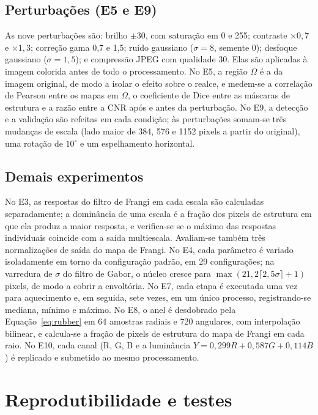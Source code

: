 \documentclass[12pt, oneside, a4paper, chapter=TITLE, section=TITLE,
               english, brazil]{abntex2}
\newcommand{\secao}[1]{\section[\texorpdfstring{\protect\MakeTextUppercase{#1}}{#1}]{#1}}
\begin{document}
\subsection{Perturbações (E5 e E9)}

As nove perturbações são: brilho $\pm 30$, com saturação em 0 e 255;
contraste $\times 0{,}7$ e $\times 1{,}3$; correção gama 0,7 e 1,5; ruído
gaussiano ($\sigma = 8$, semente 0); desfoque gaussiano ($\sigma = 1{,}5$); e
compressão JPEG com qualidade 30. Elas são aplicadas à imagem colorida antes
de todo o processamento. No E5, a região $\Omega$ é a da imagem original, de
modo a isolar o efeito sobre o realce, e medem-se a correlação de Pearson
entre os mapas em $\Omega$, o coeficiente de Dice entre as máscaras de
estrutura e a razão entre a CNR após e antes da perturbação. No E9, a detecção
e a validação são refeitas em cada condição; às perturbações somam-se três
mudanças de escala (lado maior de 384, 576 e 1152 pixels a partir do
original), uma rotação de $10^\circ$ e um espelhamento horizontal.

\subsection{Demais experimentos}

No E3, as respostas do filtro de Frangi em cada escala são calculadas
separadamente; a dominância de uma escala é a fração dos pixels de estrutura
em que ela produz a maior resposta, e verifica-se se o máximo das respostas
individuais coincide com a saída multiescala. Avaliam-se também três
normalizações de saída do mapa de Frangi. No E4, cada parâmetro é variado
isoladamente em torno da configuração padrão, em 29 configurações; na
varredura de $\sigma$ do filtro de Gabor, o núcleo cresce para
$\max(21, 2\lceil 2{,}5\sigma\rceil + 1)$ pixels, de modo a cobrir a
envoltória. No E7, cada etapa é executada uma vez para aquecimento e, em
seguida, sete vezes, em um único processo, registrando-se mediana, mínimo e
máximo. No E8, o anel é desdobrado pela Equação~\eqref{eq:rubber} em 64
amostras radiais e 720 angulares, com interpolação bilinear, e calcula-se a
fração de pixels de estrutura do mapa de Frangi em cada raio. No E10, cada
canal (R, G, B e a luminância $Y = 0{,}299R + 0{,}587G + 0{,}114B$) é
replicado e submetido ao mesmo processamento.

\secao{Reprodutibilidade e testes}
\end{document}

